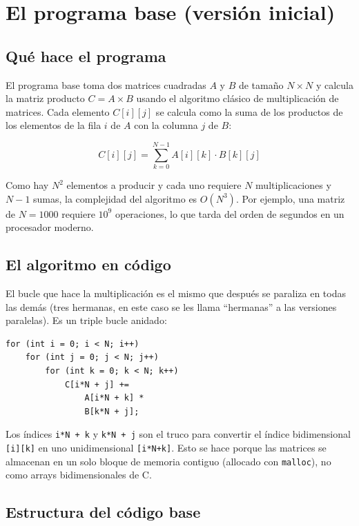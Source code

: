 \section{El programa base (versión inicial)}

\subsection{Qué hace el programa}

El programa base toma dos matrices cuadradas $A$ y $B$ de tamaño $N \times N$ y calcula la matriz producto $C = A \times B$ usando el algoritmo clásico de multiplicación de matrices. Cada elemento $C[i][j]$ se calcula como la suma de los productos de los elementos de la fila $i$ de $A$ con la columna $j$ de $B$:

\[
C[i][j] = \sum_{k=0}^{N-1} A[i][k] \cdot B[k][j]
\]

Como hay $N^2$ elementos a producir y cada uno requiere $N$ multiplicaciones y $N-1$ sumas, la complejidad del algoritmo es $O(N^3)$. Por ejemplo, una matriz de $N = 1000$ requiere $10^9$ operaciones, lo que tarda del orden de segundos en un procesador moderno.

\subsection{El algoritmo en código}

El bucle que hace la multiplicación es el mismo que después se paraliza en todas las demás (tres hermanas, en este caso se les llama ``hermanas'' a las versiones paralelas). Es un triple bucle anidado:

\begin{verbatim}
for (int i = 0; i < N; i++)
    for (int j = 0; j < N; j++)
        for (int k = 0; k < N; k++)
            C[i*N + j] +=
                A[i*N + k] *
                B[k*N + j];
\end{verbatim}

Los índices \texttt{i*N + k} y \texttt{k*N + j} son el truco para convertir el índice bidimensional \texttt{[i][k]} en uno unidimensional \texttt{[i*N+k]}. Esto se hace porque las matrices se almacenan en un solo bloque de memoria contiguo (allocado con \texttt{malloc}), no como arrays bidimensionales de C.

\subsection{Estructura del código base}

